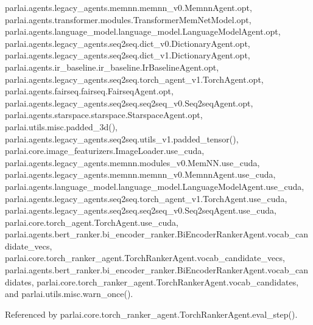 parlai.\+agents.\+legacy\+\_\+agents.\+memnn.\+memnn\+\_\+v0.\+Memnn\+Agent.\+opt, parlai.\+agents.\+transformer.\+modules.\+Transformer\+Mem\+Net\+Model.\+opt, parlai.\+agents.\+language\+\_\+model.\+language\+\_\+model.\+Language\+Model\+Agent.\+opt, parlai.\+agents.\+legacy\+\_\+agents.\+seq2seq.\+dict\+\_\+v0.\+Dictionary\+Agent.\+opt, parlai.\+agents.\+legacy\+\_\+agents.\+seq2seq.\+dict\+\_\+v1.\+Dictionary\+Agent.\+opt, parlai.\+agents.\+ir\+\_\+baseline.\+ir\+\_\+baseline.\+Ir\+Baseline\+Agent.\+opt, parlai.\+agents.\+legacy\+\_\+agents.\+seq2seq.\+torch\+\_\+agent\+\_\+v1.\+Torch\+Agent.\+opt, parlai.\+agents.\+fairseq.\+fairseq.\+Fairseq\+Agent.\+opt, parlai.\+agents.\+legacy\+\_\+agents.\+seq2seq.\+seq2seq\+\_\+v0.\+Seq2seq\+Agent.\+opt, parlai.\+agents.\+starspace.\+starspace.\+Starspace\+Agent.\+opt, parlai.\+utils.\+misc.\+padded\+\_\+3d(), parlai.\+agents.\+legacy\+\_\+agents.\+seq2seq.\+utils\+\_\+v1.\+padded\+\_\+tensor(), parlai.\+core.\+image\+\_\+featurizers.\+Image\+Loader.\+use\+\_\+cuda, parlai.\+agents.\+legacy\+\_\+agents.\+memnn.\+modules\+\_\+v0.\+Mem\+N\+N.\+use\+\_\+cuda, parlai.\+agents.\+legacy\+\_\+agents.\+memnn.\+memnn\+\_\+v0.\+Memnn\+Agent.\+use\+\_\+cuda, parlai.\+agents.\+language\+\_\+model.\+language\+\_\+model.\+Language\+Model\+Agent.\+use\+\_\+cuda, parlai.\+agents.\+legacy\+\_\+agents.\+seq2seq.\+torch\+\_\+agent\+\_\+v1.\+Torch\+Agent.\+use\+\_\+cuda, parlai.\+agents.\+legacy\+\_\+agents.\+seq2seq.\+seq2seq\+\_\+v0.\+Seq2seq\+Agent.\+use\+\_\+cuda, parlai.\+core.\+torch\+\_\+agent.\+Torch\+Agent.\+use\+\_\+cuda, parlai.\+agents.\+bert\+\_\+ranker.\+bi\+\_\+encoder\+\_\+ranker.\+Bi\+Encoder\+Ranker\+Agent.\+vocab\+\_\+candidate\+\_\+vecs, parlai.\+core.\+torch\+\_\+ranker\+\_\+agent.\+Torch\+Ranker\+Agent.\+vocab\+\_\+candidate\+\_\+vecs, parlai.\+agents.\+bert\+\_\+ranker.\+bi\+\_\+encoder\+\_\+ranker.\+Bi\+Encoder\+Ranker\+Agent.\+vocab\+\_\+candidates, parlai.\+core.\+torch\+\_\+ranker\+\_\+agent.\+Torch\+Ranker\+Agent.\+vocab\+\_\+candidates, and parlai.\+utils.\+misc.\+warn\+\_\+once().



Referenced by parlai.\+core.\+torch\+\_\+ranker\+\_\+agent.\+Torch\+Ranker\+Agent.\+eval\+\_\+step().

